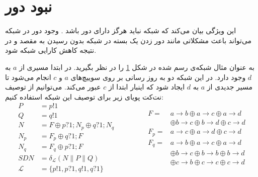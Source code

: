 \documentclass[
msc,
irfonts
]{./tex/tehran-thesis}
\newcommand{\پ}{پروژه/پایان‌نامه/رساله }
\theoremstyle{definition}
\theoremstyle{theorem}
\theoremstyle{definition}
\numberwithin{algorithm}{chapter}
\newcommand{\s}[1]{\{#1\}}
\newcommand{\ra}{\rightarrow}
\begin{document}
 
\section{نبود دور}
این ویژگی بیان می‌کند که شبکه‌ نباید هرگز دارای دور باشد
\cite{foerster2018survey}.
وجود دور در شبکه می‌تواند باعث مشکلاتی مانند دور زدن یک بسته در شبکه بدون رسیدن به مقصد و در نتیجه کاهش کارایی شبکه شود.
\begin{figure}
    \centering
    \caption{ }
    \label{fig:loop}
\end{figure}
به عنوان مثال شبکه‌ی رسم شده در شکل
\ref{fig:loop}
را در نظر بگیرید.
در ابتدا مسیری از
$a$
به
$d$
وجود دارد.
در این شبکه دو به روز رسانی بر روی سوییچ‌های
$a$
و
$c$
انجام می‌شود تا مسیر جدیدی از
$a$
به
$d$
ایجاد شود که اینبار ابتدا از
$c$
عبور می‌کند.
می‌توانیم از توصیف نت‌کت پویای زیر برای توصیف این شبکه استفاده کنیم:
\begin{equation*}
    \begin{aligned}
        P           & = p!1                                             \\
        Q           & = q!1                                             \\
        N           & = F \oplus p?1;N_p \oplus q?1;N_q                 \\
        N_p         & = F_p \oplus q?1;F                                \\
        N_q         & = F_q \oplus p?1;F                                \\
        SDN         & = \delta_{\mathcal{L}}(N \parallel P \parallel Q) \\
        \mathcal{L} & = \s{p!1,p?1,q!1,q?1}
    \end{aligned}
    \qquad \qquad
    \begin{aligned}
        F    = & a\ra b \oplus a\ra c \oplus a\ra d               \\
               & \oplus b\ra c \oplus b\ra d \oplus c\ra d        \\
        F_p  = & a\ra c \oplus a\ra d \oplus c\ra d               \\
        F_q  = & a\ra b \oplus a\ra c \oplus a\ra d               \\
               & \oplus b\ra c \oplus b\ra b \oplus b\ra d        \\
               & \oplus        c\ra b \oplus c\ra c \oplus c\ra d
    \end{aligned}
\end{equation*}
\end{document}
